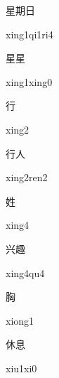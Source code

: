 \begin{multicols*}{2}
\begin{verbete}[xing1qi1ri4]{星期日}
\begin{pronuncia}{xing1qi1ri4}
\end{pronuncia}
\end{verbete}

\begin{verbete}{星星}
\begin{pronuncia}{xing1xing0}
\end{pronuncia}
\end{verbete}

\begin{verbete}[xing2]{行}
\begin{pronuncia}{xing2}
\end{pronuncia}
\end{verbete}

\begin{verbete}{行人}
\begin{pronuncia}{xing2ren2}
\end{pronuncia}
\end{verbete}

\begin{verbete}[xing4]{姓}
\begin{pronuncia}{xing4}
\end{pronuncia}
\end{verbete}

\begin{verbete}[xing4qu4]{兴趣}
\begin{pronuncia}{xing4qu4}
\end{pronuncia}
\end{verbete}

\begin{verbete}[xiong1]{胸}
\begin{pronuncia}{xiong1}
\end{pronuncia}
\end{verbete}

\begin{verbete}[xiu1xi0]{休息}
\begin{pronuncia}{xiu1xi0}
\end{pronuncia}
\end{verbete}


\end{multicols*}
